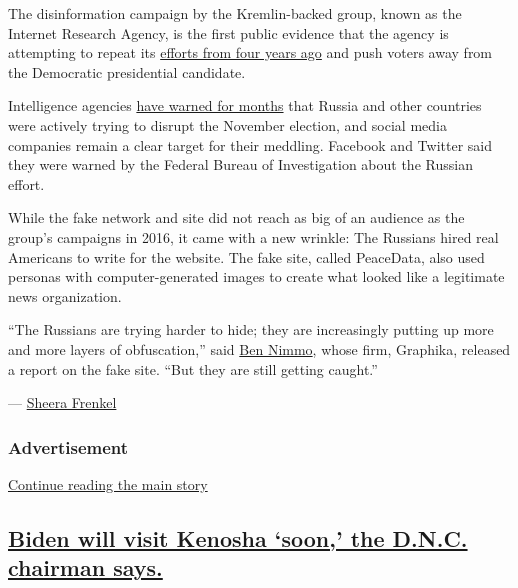 The disinformation campaign by the Kremlin-backed group, known as the
Internet Research Agency, is the first public evidence that the agency
is attempting to repeat its
\href{https://www.nytimes3xbfgragh.onion/2018/02/18/world/europe/russia-troll-factory.html}{efforts
from four years ago} and push voters away from the Democratic
presidential candidate.

Intelligence agencies
\href{https://www.nytimes3xbfgragh.onion/2020/08/07/us/politics/russia-china-trump-biden-election-interference.html}{have
warned for months} that Russia and other countries were actively trying
to disrupt the November election, and social media companies remain a
clear target for their meddling. Facebook and Twitter said they were
warned by the Federal Bureau of Investigation about the Russian effort.

While the fake network and site did not reach as big of an audience as
the group's campaigns in 2016, it came with a new wrinkle: The Russians
hired real Americans to write for the website. The fake site, called
PeaceData, also used personas with computer-generated images to create
what looked like a legitimate news organization.

``The Russians are trying harder to hide; they are increasingly putting
up more and more layers of obfuscation,'' said
\href{https://www.nytimes3xbfgragh.onion/2020/02/09/technology/ben-nimmo-disinformation-russian-bots.html}{Ben
Nimmo}, whose firm, Graphika, released a report on the fake site. ``But
they are still getting caught.''

--- \href{https://www.nytimes3xbfgragh.onion/by/sheera-frenkel}{Sheera
Frenkel}

\hypertarget{advertisement-1}{%
\subsubsection{Advertisement}\label{advertisement-1}}

\protect\hyperlink{after-dfp-ad-mid2}{Continue reading the main story}

\hypertarget{biden-will-visit-kenosha-soon-the-dnc-chairman-says}{%
\subsection{\texorpdfstring{\protect\hyperlink{biden-will-visit-kenosha-soon-the-dnc-chairman-says}{Biden
will visit Kenosha `soon,' the D.N.C. chairman
says.}}{Biden will visit Kenosha `soon,' the D.N.C. chairman says.}}\label{biden-will-visit-kenosha-soon-the-dnc-chairman-says}}

